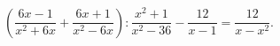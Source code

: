 \begin{ex}[type=equation]
	\begin{condition}
		$\left(\dfrac{6 x - 1}{x^2 + 6x} + \dfrac{6x + 1}{x^2 - 6x}\right) : \dfrac{x^2 +1}{x^2 - 36} - \dfrac{12}{x - 1} = \dfrac{12}{x - x^2}.$
	\end{condition}
\end{ex}